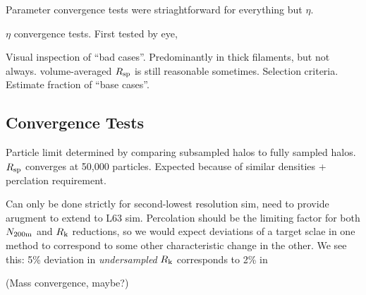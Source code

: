\documentclass[numberedappendix,apj]{emulateapj}
\begin{document}
Parameter convergence tests were striaghtforward for everything but $\eta$.

$\eta$ convergence tests. First tested by eye, 

Visual inspection of ``bad cases''. Predominantly in thick filaments, but not
always. volume-averaged $R_{\rm sp}$ is still reasonable sometimes. Selection
criteria. Estimate fraction of ``base cases''.

\subsection{Convergence Tests}

Particle limit determined by comparing subsampled halos to fully sampled halos.
$R_{\rm sp}$ converges at 50,000 particles. Expected because of similar
densities + perclation requirement.

Can only be done strictly for second-lowest resolution sim, need to provide
arugment to extend to L63 sim. Percolation should be the limiting factor
for both $N_{\rm 200m}$ and $R_{\rm k}$ reductions, so we would expect
deviations of a target sclae in one method to correspond to some other
characteristic change in the other. We see this: 5\% deviation in
\emph{undersampled} $R_{\rm k}$ corresponds to 2\% in 

(Mass convergence, maybe?)
\end{document}
